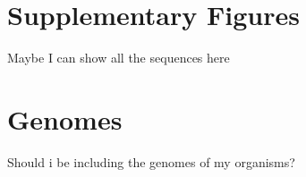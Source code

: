 \begin{appendix}


\chapter{Supplementary Figures}

Maybe I can show all the sequences here


\chapter{Genomes}

Should i be including the genomes of my organisms?


\end{appendix}
